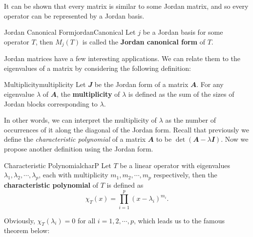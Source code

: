 \documentclass[math]{amznotes}
\theoremstyle{remark}
\begin{document}
It can be shown that every matrix is similar to some Jordan matrix, and so every operator can be represented by a Jordan basis.
\begin{dfnbox}{Jordan Canonical Form}{jordanCanonical}
    Let $j$ be a Jordan basis for some operator $T$, then $M_j(T)$ is called the {\color{red} \textbf{Jordan canonical form}} of $T$.
\end{dfnbox}
Jordan matrices have a few interesting applications. We can relate them to the eigenvalues of a matrix by considering the following definition:
\begin{dfnbox}{Multiplicity}{multiplicity}
    Let $\mathbfit{J}$ be the Jordan form of a matrix $\mathbfit{A}$. For any eigenvalue $\lambda$ of $\mathbfit{A}$, the {\color{red} \textbf{multiplicity}} of $\lambda$ is defined as the sum of the sizes of Jordan blocks corresponding to $\lambda$.
\end{dfnbox}
In other words, we can interpret the multiplicity of $\lambda$ as the number of occurrences of it along the diagonal of the Jordan form. Recall that previously we define the \textit{characteristic polynomial} of a matrix $\mathbfit{A}$ to be $\det(\mathbfit{A} - \lambda\mathbfit{I})$. Now we propose another definition using the Jordan form.
\begin{dfnbox}{Characteristic Polynomial}{charP}
    Let $T$ be a linear operator with eigenvalues $\lambda_1, \lambda_2, \cdots, \lambda_p$, each with multiplicity $m_1, m_2, \cdots, m_p$ respectively, then the {\color{red} \textbf{characteristic polynomial}} of $T$ is defined as 
    \begin{equation*}
        \chi_T(x) = \prod_{i = 1}^{p}(x - \lambda_i)^{m_i}.
    \end{equation*}
\end{dfnbox}
Obviously, $\chi_T(\lambda_i) = 0$ for all $i = 1, 2, \cdots, p$, which leads us to the famous theorem below:
\end{document}
